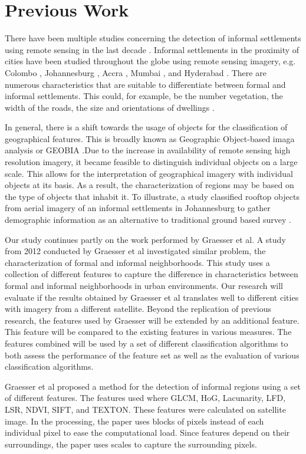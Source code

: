 \section{Previous Work}

There have been multiple studies concerning the detection of informal
settlements using remote sensing in the last decade \cite{kuffer2016slums}.
Informal settlements in the proximity of cities have been studied throughout
the globe using remote sensing imagery, e.g. Colombo \cite{colombo},
Johannesburg \cite{williams2016automatic}, Accra \cite{accra}, Mumbai
\cite{mumbai}, and Hyderabad \cite{hyderabad}. There are numerous
characteristics that are suitable to differentiate between formal and informal
settlements. This could, for example,  be the number vegetation, the width of
the roads, the size and orientations of dwellings \cite{owen2013approach}.

In general, there is a shift towards the usage of objects for the
classification of geographical features. This is broadly known as Geographic
Object-based imaga analysis or GEOBIA \cite{hay2008geographic}.Due to the
increase in availability of remote sensing high resolution imagery, it became
feasible to distinguish individual objects on a large scale.  This allows for
the interpretation of geographical imagery with individual objects at its
basis.  As a result, the characterization of regions may be based on the type
of objects that inhabit it.  To illustrate, a study classified rooftop objects
from aerial imagery of an informal settlements in Johannesburg to gather
demographic information as an alternative to traditional ground based survey
\cite{williams2016automatic}.


Our study continues partly on the work performed by Graesser et al.  A study
from 2012 conducted by Graesser et al  investigated similar
problem, the characterization of formal and informal neighborhoods.  This study
uses a collection of different features to capture the difference in
characteristics between formal and informal neighborhoods in urban
environments. Our research will evaluate if the results obtained by Graesser et
al translates well to different cities with imagery from a different
satellite. Beyond the replication of previous research, the features used by
Graesser will be extended by an additional feature. This feature will be
compared to the existing features in various measures. The features combined
will be used by a set of different classification algorithms to both assess the
performance of the feature set as well as the evaluation of various
classification algorithms.



Graesser et al proposed a method for the detection of informal regions using
a set of different features. The features used where GLCM, HoG, Lacunarity,
LFD, LSR, NDVI, SIFT, and TEXTON. These features were calculated on satellite
image. In the processing, the paper uses blocks of pixels instead of each
individual pixel to ease the computational load. Since features depend on their
surroundings, the paper uses scales to capture the surrounding pixels. 

